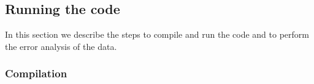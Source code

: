 
\subsection{Running the code}\label{sec:running}

In this section we describe the steps to compile and run the code and to perform the error analysis of the data.

\subsubsection{Compilation}

